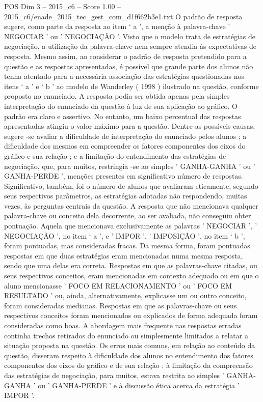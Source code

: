 \begin{textsample}{POS Dim 3 – 2015\_c6 – Score 1.00 – 2015\_c6/enade\_2015\_tec\_gest\_com\_d1f662b3e1.txt}
O padrão de resposta sugere, como parte da resposta ao item ‘ a ’, a menção à palavra-chave ' NEGOCIAR ' ou ' NEGOCIAÇÃO '.
Visto que o modelo trata de estratégias de negociação, a utilização da palavra-chave nem sempre atendia às expectativas de resposta.
Mesmo assim, ao considerar o padrão de resposta pretendido para a questão e as respostas apresentadas, é possível que grande parte dos alunos não tenha atentado para a necessária associação das estratégias questionadas nos itens ‘ a ’ e ‘ b ’ ao modelo de Wanderley ( 1998 ) ilustrado na questão, conforme proposto no enunciado.
A resposta podia ser obtida apenas pela simples interpretação do enunciado da questão à luz de sua aplicação ao gráfico.
O padrão era claro e assertivo.
No entanto, um baixo percentual das respostas apresentadas atingiu o valor máximo para a questão.
Dentre as possíveis causas, sugere -se avaliar a dificuldade de interpretação do enunciado pelos alunos ; a dificuldade dos mesmos em compreender os fatores componentes dos eixos do gráfico e sua relação ; e a limitação do entendimento das estratégias de negociação, que, para muitos, restringia -se ao simples ' GANHA-GANHA ' ou ' GANHA-PERDE ', menções presentes em significativo número de respostas.
Significativo, também, foi o número de alunos que avaliaram eticamente, segundo seus respectivos parâmetros, as estratégias adotadas não respondendo, muitas vezes, às perguntas centrais da questão.
A resposta que não mencionava qualquer palavra-chave ou conceito dela decorrente, ao ser avaliada, não conseguiu obter pontuação.
Aquela que mencionava exclusivamente as palavras ' NEGOCIAR ', ' NEGOCIAÇÃO ', no item ‘ a ’, e ' IMPOR ', ' IMPOSIÇÃO ', no item ‘ b ’, foram pontuadas, mas consideradas fracas.
Da mesma forma, foram pontuadas respostas em que duas estratégias eram mencionadas numa mesma resposta, sendo que uma delas era correta.
Respostas em que as palavras-chave citadas, ou seus respectivos conceitos, eram mencionadas em contexto adequado ou em que o aluno mencionasse ' FOCO EM RELACIONAMENTO ' ou ' FOCO EM RESULTADO ' ou, ainda, alternativamente, explicasse um ou outro conceito, foram consideradas medianas.
Respostas em que as palavras-chave ou seus respectivos conceitos foram mencionados ou explicados de forma adequada foram consideradas como boas.
A abordagem mais frequente nas respostas erradas continha trechos retirados do enunciado ou simplesmente limitados a relatar a situação proposta na questão.
Os erros mais comuns, em relação ao conteúdo da questão, disseram respeito à dificuldade dos alunos no entendimento dos fatores componentes dos eixos do gráfico e de sua relação ; à limitação da compreensão das estratégias de negociação, para muitos, estava restrita ao simples ' GANHA-GANHA ' ou ' GANHA-PERDE ' e à discussão ética acerca da estratégia ' IMPOR '.

\end{textsample}

